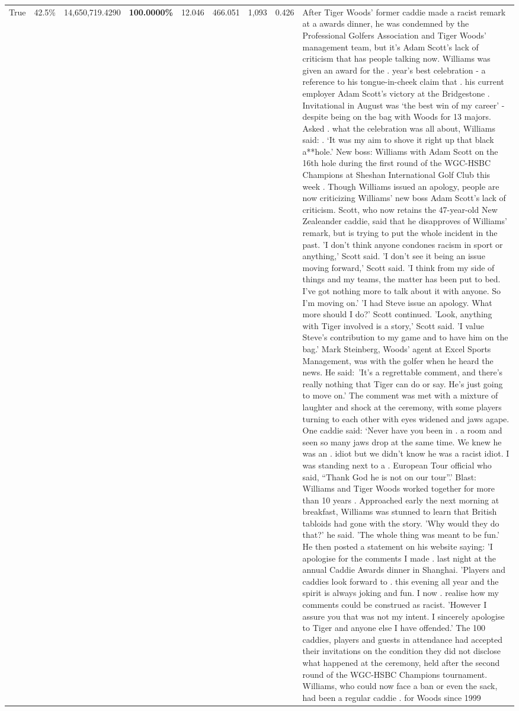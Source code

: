 \begin{table}[H]
\begin{tabular}{lllrlllll}
True & 42.5\% & 14,650,719.4290 & \bfseries \color{red} 100.0000\% & 12.046 & 466.051 & 1,093 & 0.426 & After Tiger Woods' former caddie made a racist remark at a awards dinner, he was condemned by the Professional Golfers Association and Tiger Woods' management team, but it's Adam Scott's lack of criticism that has people talking now. Williams was given an award for the . year’s best celebration - a reference to his tongue-in-cheek claim that . his current employer Adam Scott’s victory at the Bridgestone . Invitational in August was ‘the best win of my career’ - despite being on the bag with Woods for 13 majors. Asked . what the celebration was all about, Williams said: . ‘It was my aim to shove it right up that black a**hole.’ New boss: Williams with Adam Scott  on the 16th hole during the first round of the WGC-HSBC Champions at Sheshan International Golf Club this week . Though Williams issued an apology, people are now criticizing Williams' new boss Adam Scott's lack of criticism. Scott, who now retains the 47-year-old New Zealeander caddie, said that he disapproves of Williams' remark, but is trying to put the whole incident in the past. 'I don't think anyone condones racism in sport or anything,' Scott said. 'I don't see it being an issue moving forward,' Scott said. 'I think from my side of things and my teams, the matter has been put to bed. I've got nothing more to talk about it with anyone. So I'm moving on.' 'I had Steve issue an apology. What more should I do?' Scott continued. 'Look, anything with Tiger involved is a story,' Scott said. 'I value Steve's contribution to my game and to have him on the bag.' Mark Steinberg, Woods' agent at Excel Sports Management, was with the golfer when he heard the news. He said: 'It's a regrettable comment, and there's really nothing that Tiger can do or say. He's just going to move on.' The comment was met with a mixture of laughter and shock at the ceremony, with some players turning to each other with eyes widened and jaws agape. One caddie said: ‘Never have you been in . a room and seen so many jaws drop at the same time. We knew he was an . idiot but we didn’t know he was a racist idiot. I was standing next to a . European Tour official who said, “Thank God he is not on our tour”.’ Blast: Williams and Tiger Woods worked together for more than 10 years . Approached early the next morning at breakfast, Williams was stunned to learn that British tabloids had gone with the story. 'Why would they do that?' he said. 'The whole thing was meant to be fun.' He then posted a statement on his website saying: 'I apologise for the comments I made . last night at the annual Caddie Awards dinner in Shanghai. 'Players and caddies look forward to . this evening all year and the spirit is always joking and fun. I now . realise how my comments could be construed as racist. 'However I assure you that was not my intent. I sincerely apologise to Tiger and anyone else I have offended.' The 100 caddies, players and guests in attendance had accepted their invitations on the condition they did not disclose what happened at the ceremony, held after the second round of the WGC-HSBC Champions tournament. Williams, who could now face a ban or even the sack, had been a regular caddie . for Woods since 1999 
\end{tabular}
\end{table}
